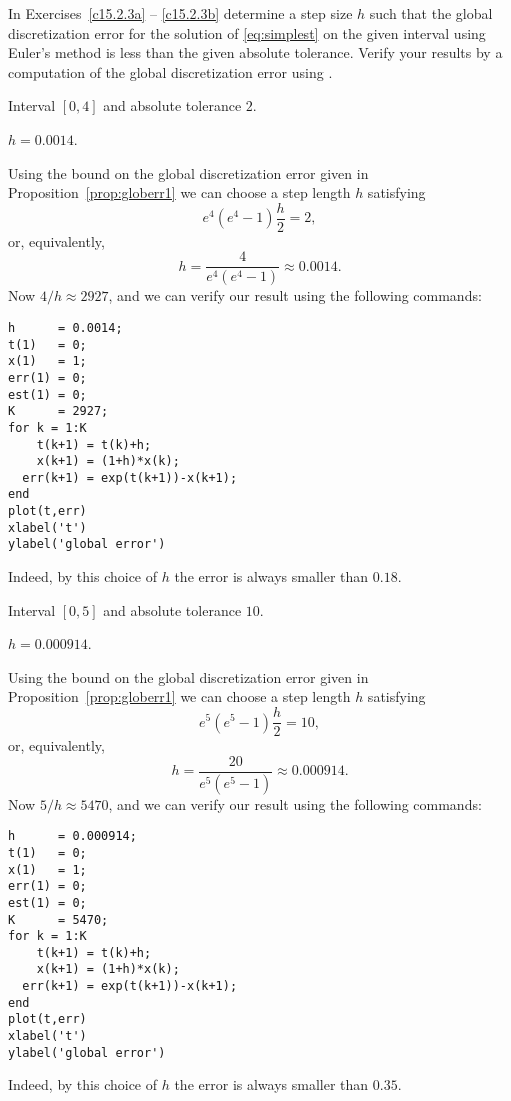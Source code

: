 \documentclass{ximera}
\begin{document}
\CEXER

\noindent In Exercises~\ref{c15.2.3a} -- \ref{c15.2.3b}
determine a step size $h$ such that the global discretization error
for the solution of \eqref{eq:simplest} on the given interval using 
Euler's method is less than the given absolute tolerance.  Verify 
your results by a computation of the global discretization error 
using \Matlabp.
\begin{exercise} \label{c15.2.3a}
Interval $[0,4]$ and absolute tolerance $2$.

\begin{solution}
\ans $h=0.0014$.

\soln Using the bound on the global discretization error
given in Proposition~\ref{prop:globerr1} we can choose a
step length $h$ satisfying
\[
e^4(e^4-1)\frac{h}{2} = 2,
\]
or, equivalently,
\[
h = \frac{4}{e^4(e^4-1)} \approx 0.0014.
\]
Now $4/h \approx 2927$, and we can verify our result using the
following \Matlab commands:
\begin{verbatim}
h      = 0.0014;
t(1)   = 0;
x(1)   = 1;
err(1) = 0;
est(1) = 0;
K      = 2927;
for k = 1:K
    t(k+1) = t(k)+h;
    x(k+1) = (1+h)*x(k);
  err(k+1) = exp(t(k+1))-x(k+1);
end
plot(t,err)
xlabel('t')
ylabel('global error')
\end{verbatim}
Indeed, by this choice of $h$ the error is always smaller than $0.18$.


\end{solution}
\end{exercise}
\begin{exercise} \label{c15.2.3b}
Interval $[0,5]$ and absolute tolerance $10$.

\begin{solution}
\ans $h=0.000914$.

\soln Using the bound on the global discretization error
given in Proposition~\ref{prop:globerr1} we can choose a
step length $h$ satisfying
\[
e^{5}(e^{5}-1)\frac{h}{2} = 10,
\]
or, equivalently,
\[
h = \frac{20}{e^{5}(e^{5}-1)} \approx 0.000914.
\]
Now $5/h \approx 5470$, and we can verify our result using the
following \Matlab commands:
\begin{verbatim}
h      = 0.000914;
t(1)   = 0;
x(1)   = 1;
err(1) = 0;
est(1) = 0;
K      = 5470;
for k = 1:K
    t(k+1) = t(k)+h;
    x(k+1) = (1+h)*x(k);
  err(k+1) = exp(t(k+1))-x(k+1);
end
plot(t,err)
xlabel('t')
ylabel('global error')
\end{verbatim}
Indeed, by this choice of $h$ the error is always smaller than $0.35$.


\end{solution}
\end{exercise}
\end{document}
